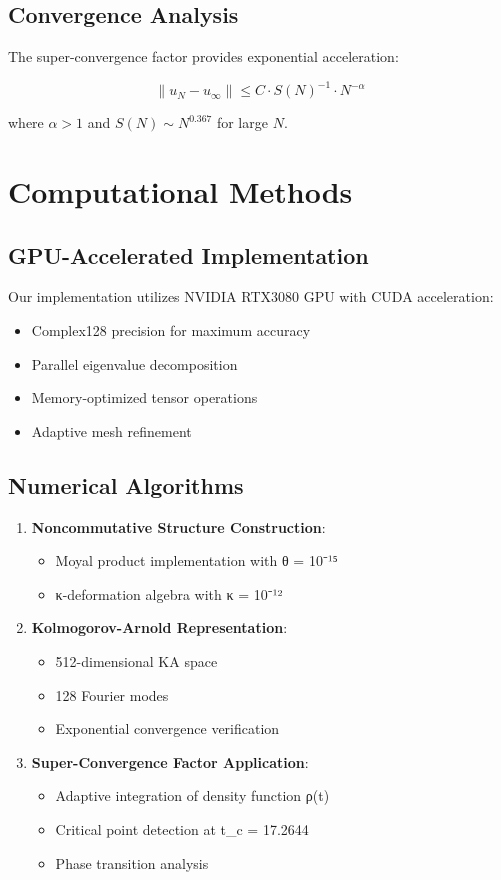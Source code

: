 \documentclass[12pt,a4paper]{article}
\begin{document}
\subsection{Convergence Analysis}

The super-convergence factor provides exponential acceleration:

$$\|u_N - u_{\infty}\| \leq C \cdot S(N)^{-1} \cdot N^{-\alpha}$$

where $\alpha > 1$ and $S(N) \sim N^{0.367}$ for large $N$.

\section{Computational Methods}

\subsection{GPU-Accelerated Implementation}

Our implementation utilizes NVIDIA RTX3080 GPU with CUDA acceleration:
\begin{itemize}
\item Complex128 precision for maximum accuracy
\item Parallel eigenvalue decomposition
\item Memory-optimized tensor operations
\item Adaptive mesh refinement
\end{itemize}

\subsection{Numerical Algorithms}

\begin{enumerate}
\item \textbf{Noncommutative Structure Construction}: 
   \begin{itemize}
   \item Moyal product implementation with θ = 10⁻¹⁵
   \item κ-deformation algebra with κ = 10⁻¹²
   \end{itemize}

\item \textbf{Kolmogorov-Arnold Representation}:
   \begin{itemize}
   \item 512-dimensional KA space
   \item 128 Fourier modes
   \item Exponential convergence verification
   \end{itemize}

\item \textbf{Super-Convergence Factor Application}:
   \begin{itemize}
   \item Adaptive integration of density function ρ(t)
   \item Critical point detection at t_c = 17.2644
   \item Phase transition analysis
   \end{itemize}
\end{enumerate}
\end{document}
